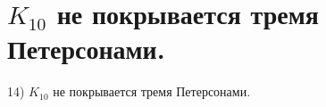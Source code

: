 \section{
 $K_{10}$ не покрывается тремя Петерсонами.
}

14) $K_{10}$ не покрывается тремя Петерсонами.
